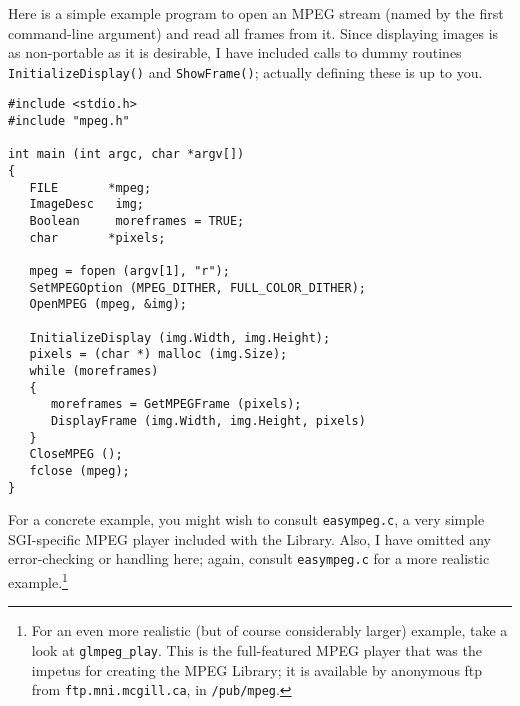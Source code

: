 \documentclass[11pt]{article}
\newcommand{\code}[1]{\texttt{#1}}
\begin{document}
Here is a simple example program to open an MPEG stream (named by the
first command-line argument) and read all frames from it.  Since
displaying images is as non-portable as it is desirable, I have
included calls to dummy routines \code{InitializeDisplay()} and
\code{ShowFrame()}; actually defining these is up to you.  
\begin{verbatim}
#include <stdio.h>
#include "mpeg.h"

int main (int argc, char *argv[])
{
   FILE       *mpeg;
   ImageDesc   img;
   Boolean     moreframes = TRUE;
   char       *pixels;

   mpeg = fopen (argv[1], "r");
   SetMPEGOption (MPEG_DITHER, FULL_COLOR_DITHER);
   OpenMPEG (mpeg, &img);

   InitializeDisplay (img.Width, img.Height);
   pixels = (char *) malloc (img.Size);
   while (moreframes)
   {
      moreframes = GetMPEGFrame (pixels);
      DisplayFrame (img.Width, img.Height, pixels)
   }
   CloseMPEG ();
   fclose (mpeg);
}
\end{verbatim}

For a concrete example, you might wish to consult \code{easympeg.c}, a
very simple SGI-specific MPEG player included with the Library.  Also,
I have omitted any error-checking or handling here; again, consult
\code{easympeg.c} for a more realistic example.\footnote{For an even
more realistic (but of course considerably larger) example, take a
look at \code{glmpeg\_play}.  This is the full-featured MPEG player
that was the impetus for creating the MPEG Library; it is available by
anonymous ftp from \code{ftp.mni.mcgill.ca}, in \code{/pub/mpeg}.}
\end{document}
